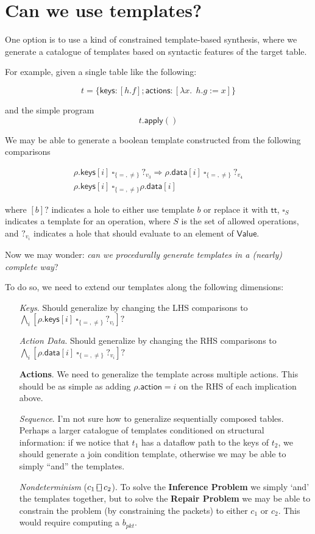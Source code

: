 \documentclass{article}
\newcommand{\TRUE}{\mathsf{tt}}
\newcommand{\Value}{\mathsf{Value}}
\newcommand{\action}{\mathsf{action}}
\newcommand{\actions}{\mathsf{actions}}
\newcommand{\keys}{\mathsf{keys}}
\newcommand{\data}{\mathsf{data}}
\newcommand{\apply}{\mathsf{apply}}
\newcommand{\choiceop}{\rotatebox[origin=c]{90}{$\sqsubset\!\!\!\sqsupset$}}
\newcommand{\choice}{\mathbin{\choiceop}}
\theoremstyle{plain}
\theoremstyle{definition}
\theoremstyle{remark}
\begin{document}
\section{Can we use templates?}

One option is to use a kind of constrained template-based synthesis, where we
generate a catalogue of templates based on syntactic features of the target table.

For example, given a single table like the following:

\[t = \{\keys: [h.f]; \actions: [\lambda x.~~h.g:= x]\}\]

and the simple program \[t.\apply()\]

We may be able to generate a boolean template constructed from the following
comparisons

\[
\begin{array}{l}
  \rho.\keys[i]~\square_{\{=,\neq\}}~?_{v_3} \Rightarrow \rho.\data[i]~\square_{\{=,\neq\}}~?_{v_4} \\

  \rho.\keys[i]~\square_{\{=,\neq\}}\rho.\data[i]
\end{array}\]

where $[b]?$ indicates a hole to either use template $b$ or replace it with
$\TRUE$, $\square_S$ indicates a template for an operation, where $S$ is the set
of allowed operations, and $?_{v_i}$ indicates a hole that should evaluate to an element
of $\Value$.



Now we may wonder: \emph{can we procedurally generate templates in a (nearly) complete way}?

To do so, we need to extend our templates along the following dimensions:
\begin{enumerate}[align=left]
\item[\textit{Keys}.] Should generalize by changing the LHS comparisons to $
  \bigwedge_i[\rho.\keys[i]~\square_{\{=,\neq\}}~?_{v_i}]?$
\item[\textit{Action Data}.] Should generalize by changing the RHS comparisons to $\bigwedge_i[\rho.\data[i]~\square_{\{=,\neq\}}~?_{v_i}]?$
\item[\textbf{Actions}.] We need to generalize the template across multiple actions. This should be as simple as adding $\rho.\action = i$ on the RHS of each implication above.
\item[\textit{Sequence}.] I'm not sure how to generalize sequentially composed tables.
  Perhaps a larger catalogue of templates conditioned on structural information:
  if we notice that $t_1$ has a dataflow path to the keys of $t_2$, we should
  generate a join condition template, otherwise we may be able to simply ``and'' the templates.

\item[\textit{Nondeterminism} ($c_1 \choice c_2$).] To solve the
  \textbf{Inference Problem} we simply `and' the templates together, but to solve
  the \textbf{Repair Problem} we may be able to constrain the problem (by
  constraining the packets) to either $c_1$ or $c_2$. This would require
  computing a $b_{\textit{pkt}}$.
\end{enumerate}
\end{document}

